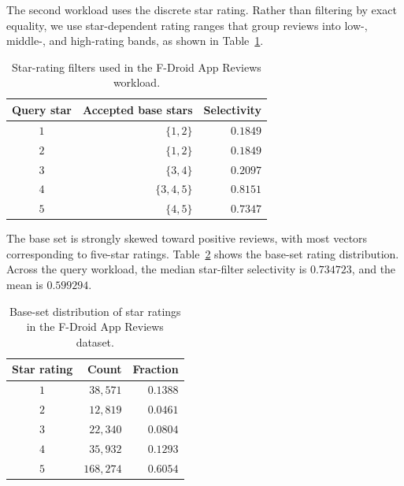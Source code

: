 The second workload uses the discrete star rating. Rather than filtering by
exact equality, we use star-dependent rating ranges that group reviews into
low-, middle-, and high-rating bands, as shown in
Table~\ref{tab:app-reviews-star-ranges}.

\begin{table}[H]
    \centering
    \renewcommand{\arraystretch}{1.15}
    \begin{tabular}{crr}
        \toprule
        Query star & Accepted base stars & Selectivity \\
        \midrule
        \(1\) & \(\{1,2\}\) & \(0.1849\) \\
        \(2\) & \(\{1,2\}\) & \(0.1849\) \\
        \(3\) & \(\{3,4\}\) & \(0.2097\) \\
        \(4\) & \(\{3,4,5\}\) & \(0.8151\) \\
        \(5\) & \(\{4,5\}\) & \(0.7347\) \\
        \bottomrule
    \end{tabular}
    \caption{Star-rating filters used in the F-Droid App Reviews workload.}
    \label{tab:app-reviews-star-ranges}
\end{table}

The base set is strongly skewed toward positive reviews, with most vectors
corresponding to five-star ratings. Table~\ref{tab:app-reviews-star-distribution}
shows the base-set rating distribution. Across the query workload, the median
star-filter selectivity is \(0.734723\), and the mean is \(0.599294\).

\begin{table}[H]
    \centering
    \renewcommand{\arraystretch}{1.15}
    \begin{tabular}{crr}
        \toprule
        Star rating & Count & Fraction \\
        \midrule
        \(1\) & \(38{,}571\) & \(0.1388\) \\
        \(2\) & \(12{,}819\) & \(0.0461\) \\
        \(3\) & \(22{,}340\) & \(0.0804\) \\
        \(4\) & \(35{,}932\) & \(0.1293\) \\
        \(5\) & \(168{,}274\) & \(0.6054\) \\
        \bottomrule
    \end{tabular}
    \caption{Base-set distribution of star ratings in the F-Droid App Reviews dataset.}
    \label{tab:app-reviews-star-distribution}
\end{table}

